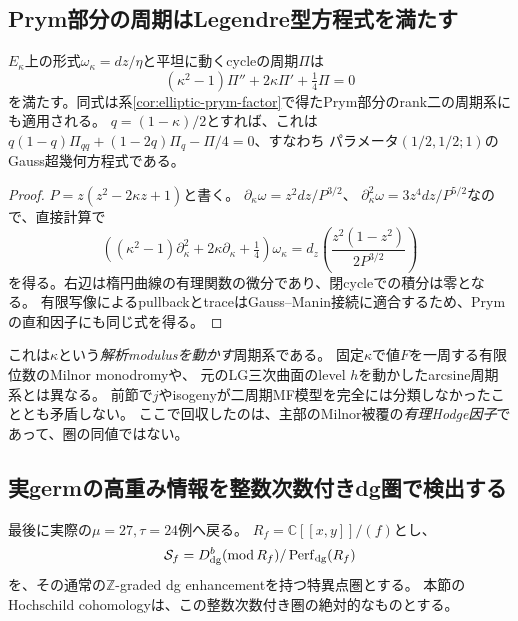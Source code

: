 \subsection{Prym部分の周期はLegendre型方程式を満たす}
\begin{proposition}
\label{prop:boundary-prym-PF}
$E_\kappa$上の形式$\omega_\kappa=dz/\eta$と平坦に動くcycleの周期$\Pi$は
\begin{equation}\label{eq:boundary-prym-PF}
 (\kappa^2-1)\Pi''+2\kappa\Pi'+\tfrac14\Pi=0
\end{equation}
を満たす。同式は系\ref{cor:elliptic-prym-factor}で得たPrym部分のrank二の周期系にも適用される。
$q=(1-\kappa)/2$とすれば、これは
$q(1-q)\Pi_{qq}+(1-2q)\Pi_q-\Pi/4=0$、すなわち
パラメータ$(1/2,1/2;1)$のGauss超幾何方程式である。
\end{proposition}
\begin{proof}
$P=z(z^2-2\kappa z+1)$と書く。
$\partial_\kappa\omega=z^2dz/P^{3/2}$、
$\partial_\kappa^2\omega=3z^4dz/P^{5/2}$なので、直接計算で
\[
 \left((\kappa^2-1)\partial_\kappa^2+2\kappa\partial_\kappa+\tfrac14\right)
 \omega_\kappa
 =d_z\left(\frac{z^2(1-z^2)}{2P^{3/2}}\right)
\]
を得る。右辺は楕円曲線の有理関数の微分であり、閉cycleでの積分は零となる。
有限写像によるpullbackとtraceはGauss--Manin接続に適合するため、Prymの直和因子にも同じ式を得る。
\end{proof}

これは$\kappa$という\emph{解析modulusを動かす}周期系である。
固定$\kappa$で値$F$を一周する有限位数のMilnor monodromyや、
元のLG三次曲面のlevel $h$を動かしたarcsine周期系とは異なる。
前節で$j$やisogenyが二周期MF模型を完全には分類しなかったこととも矛盾しない。
ここで回収したのは、主部のMilnor被覆の\emph{有理Hodge因子}であって、圏の同値ではない。

\subsection{実germの高重み情報を整数次数付きdg圏で検出する}
最後に実際の$\mu=27,\tau=24$例へ戻る。
$R_f=\mathbb C[[x,y]]/(f)$とし、
\[
 \mathcal S_f=D^b_{\rm dg}(\operatorname{mod}R_f)/\operatorname{Perf}_{\rm dg}(R_f)
\]
を、その通常の$\mathbb Z$-graded dg enhancementを持つ特異点圏とする。
本節のHochschild cohomologyは、この整数次数付き圏の絶対的なものとする。

